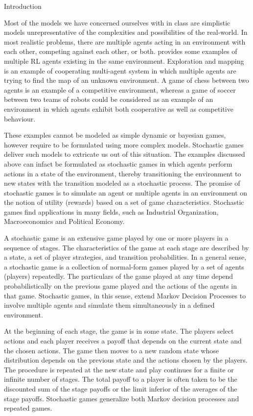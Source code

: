 \documentclass{article}
\begin{document}
\makeheader

\begin{psection}{Introduction}

	Most of the models we have concerned ourselves with in class are simplistic
	models unrepresentative of the complexities and possibilities of the
	real-world. In most realistic problems, there are multiple agents acting in
	an environment with each other, competing against each other, or both.
	\cite{rl} provides some examples of multiple RL agents existing in the same
	environment. Exploration and mapping is an example of cooperating
	multi-agent system in which multiple agents are trying to find the map of
	an unknown environment. A game of chess between two agents is an example of
	a competitive environment, whereas a game of soccer between two teams of
	robots could be considered as an example of an environment in which agents
	exhibit both cooperative as well as competitive behaviour.

	These examples cannot be modeled as simple dynamic or bayesian games,
	however require to be formulated using more complex models. Stochastic
	games deliver such models to extricate us out of this situation.  The
	examples discussed above can infact be formulated as stochastic games in
	which agents perform actions in a state of the environment, thereby
	transitioning the environment to new states with the transition modeled as
	a stochastic process. The promise of stochastic games is to simulate an
	agent or multiple agents in an environment on the notion of utility
	(rewards) based on a set of game characteristics. Stochastic games find
	applications in many fields, such as Industrial Organization,
	Macroeconomics and Political Economy.

	A stochastic game is an extensive game played by one or more players in a
	sequence of stages. The characteristics of the game at each stage are
	described by a state, a set of player strategies, and transition
	probabilities. In a general sense, a stochastic game is a collection of
	normal-form games played by a set of agents (players) repeatedly. The
	particulars of the game played at any time depend probabilistically on the
	previous game played and the actions of the agents in that game. Stochastic
	games, in this sense, extend Markov Decision Processes to involve multiple
	agents and simulate them simultaneously in a defined environment.

	At the beginning of each stage, the game is in some state. The players
	select actions and each player receives a payoff that depends on the
	current state and the chosen actions. The game then moves to a new random
	state whose distribution depends on the previous state and the actions
	chosen by the players. The procedure is repeated at the new state and play
	continues for a finite or infinite number of stages. The total payoff to a
	player is often taken to be the discounted sum of the stage payoffs or the
	limit inferior of the averages of the stage payoffs. Stochastic games
	generalize both Markov decision processes and repeated games.


\end{psection}
\end{document}
